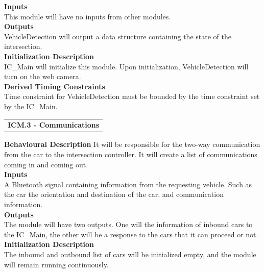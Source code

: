 \documentclass [10pt]{article}
\newcommand{\carSpeed}{1.4\ m/s}
\newcommand{\intersectionLength}{0.6\ m}
\begin{document}
\textbf{Inputs} \\
This module will have no inputs from other modules.  \\

\textbf{Outputs} \\
VehicleDetection will output a data structure containing the state of the intersection.  \\

\textbf{Initialization Description} \\
IC\_Main will initialize this module. Upon initialization, VehicleDetection will turn on the web camera. \\

\textbf{Derived Timing Constraints} \\
Time constraint for VehicleDetection must be bounded by the time constraint set by the IC\_Main.  \\

%





\begin{longtable}{p{}}
\rowcolor{tableCell}\textbf{ICM.3 - Communications} \\
\end{longtable}

\textbf{Behavioural Description} 
 It will be responsible for the two-way communication from the car to the intersection controller. It will create a list of communications coming in and coming out. \\

\textbf{Inputs} \\
  A Bluetooth signal containing information from the requesting vehicle. Such as the car the orientation and destination of the car, and communication information.\\

\textbf{Outputs} \\
    The module will have two outputs. One will the information of inbound cars to the IC\_Main, the other will be a response to the cars that it can proceed or not. \\

\textbf{Initialization Description} \\
    The inbound and outbound list of cars will be initialized empty, and the module will remain running continuously.\\
\end{document}
